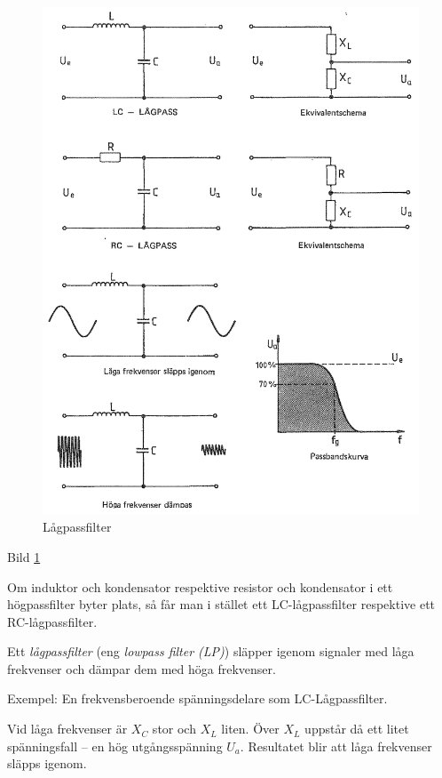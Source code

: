\begin{figure}
\includegraphics[width=\textwidth]{images/bild_2_3-23.png}
\caption{Lågpassfilter}
\label{fig:BildII3-23}
\end{figure}

Bild \ref{fig:BildII3-23}

Om induktor och kondensator respektive resistor och kondensator i ett
högpassfilter byter plats, så får man i stället ett LC-lågpassfilter respektive
ett RC-lågpassfilter.

Ett \emph{lågpassfilter} (eng \emph{lowpass filter (LP)}) släpper igenom
signaler med låga frekvenser och dämpar dem med höga frekvenser.

Exempel: En frekvensberoende spänningsdelare som LC-Lågpassfilter.

Vid låga frekvenser är \(X_C\) stor och \(X_L\) liten. Över \(X_L\) uppstår då
ett litet spänningsfall -- en hög utgångsspänning \(U_a\). Resultatet blir att
låga frekvenser släpps igenom.

